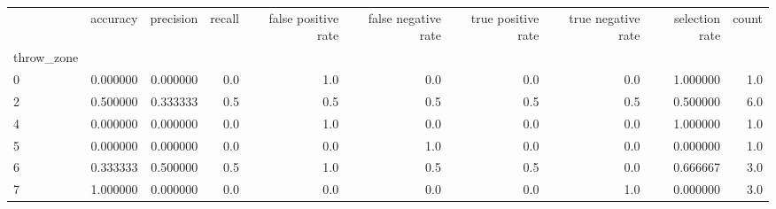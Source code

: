 \begin{tabular}{lrrrrrrrrr}
\toprule
{} &  accuracy &  precision &  recall &  false positive rate &  false negative rate &  true positive rate &  true negative rate &  selection rate &  count \\
throw\_zone &           &            &         &                      &                      &                     &                     &                 &        \\
\midrule
0          &  0.000000 &   0.000000 &     0.0 &                  1.0 &                  0.0 &                 0.0 &                 0.0 &        1.000000 &    1.0 \\
2          &  0.500000 &   0.333333 &     0.5 &                  0.5 &                  0.5 &                 0.5 &                 0.5 &        0.500000 &    6.0 \\
4          &  0.000000 &   0.000000 &     0.0 &                  1.0 &                  0.0 &                 0.0 &                 0.0 &        1.000000 &    1.0 \\
5          &  0.000000 &   0.000000 &     0.0 &                  0.0 &                  1.0 &                 0.0 &                 0.0 &        0.000000 &    1.0 \\
6          &  0.333333 &   0.500000 &     0.5 &                  1.0 &                  0.5 &                 0.5 &                 0.0 &        0.666667 &    3.0 \\
7          &  1.000000 &   0.000000 &     0.0 &                  0.0 &                  0.0 &                 0.0 &                 1.0 &        0.000000 &    3.0 \\
\bottomrule
\end{tabular}
